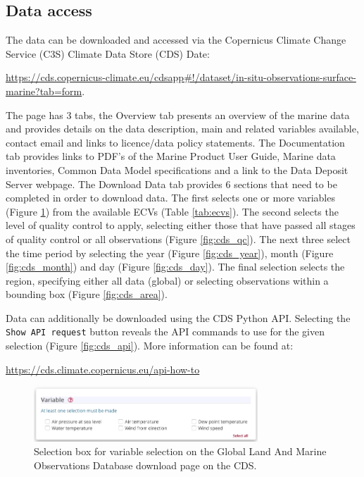 \subsection{Data access}
The data can be downloaded and accessed via the Copernicus Climate Change Service (C3S) Climate Data Store (CDS) Date:
\begin{center}
\sloppy\url{https://cds.copernicus-climate.eu/cdsapp\#!/dataset/in-situ-observations-surface-marine?tab=form}.
 \end{center}
The page has 3 tabs, the Overview tab presents an overview of the marine data and provides details on the data description, main and related variables available, contact email and links to licence/data policy statements. 
The Documentation tab provides links to PDF’s of the Marine Product User Guide, Marine data inventories, Common Data Model specifications and a link to the Data Deposit Server webpage. The Download Data tab provides 6 sections that need to be completed in order to download data. The first selects one or more variables (Figure \ref{fig:cds_variable}) from the available ECVs (Table \ref{tab:ecvs}). The second selects the level of quality control to apply, selecting either those that have passed all stages of quality control or all observations (Figure \ref{fig:cds_qc}). The next three select the time period  by selecting the year (Figure \ref{fig:cds_year}), month (Figure \ref{fig:cds_month}) and day (Figure \ref{fig:cds_day}). The final selection selects the region, specifying either all data (global) or selecting observations within a bounding box (Figure \ref{fig:cds_area}).

Data can additionally be downloaded using the CDS Python API. Selecting the \texttt{Show API request} button reveals the API commands to use for the given selection (Figure \ref{fig:cds_api}). More information can be found at:
\begin{center}
\url{https://cds.climate.copernicus.eu/api-how-to}
\end{center}

\FloatBarrier
\begin{figure}[h]
\centering
\includegraphics[width=0.75\textwidth]{resources/cds_variable_select.png}
\caption{Selection box for variable selection on the Global Land And Marine Observations Database download page on the CDS.}
\label{fig:cds_variable}
\end{figure}


